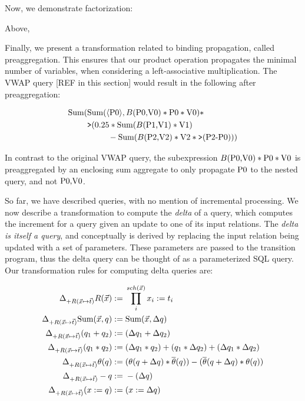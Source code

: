 Now, we demonstrate factorization: 

Above, 

Finally, we present a transformation related to binding propagation, called
preaggregation. This ensures that our product operation propagates the minimal
number of variables, when considering a left-associative multiplication.
The VWAP query [REF in this section] would result in the following after
preaggregation:

\vspace{-3mm}
\begin{align*}
\mbox{Sum}(
& \mbox{Sum}({\langle\mbox{P0}\rangle}, B(\mbox{P0,V0}) * \mbox{P0} * \mbox{V0}) *\\
& \mbox{{\tt >}}(0.25 * \mbox{Sum}(B(\mbox{P1,V1}) * \mbox{V1}) \\
& \qquad \; \; - \mbox{Sum}(B(\mbox{P2,V2}) * \mbox{V2} * \mbox{{\tt >}}(\mbox{P2-P0})))
\end{align*}

\noindent In contrast to the original VWAP query, the subexpression
$B(\mbox{P0,V0}) * \mbox{P0} * \mbox{V0}$ is preaggregated by an enclosing sum aggregate
to only propagate $\mbox{P0}$ to the nested query, and not $\mbox{P0,V0}$.

So far, we have described queries, with no mention of incremental processing. We
now describe a transformation to compute the \textit{delta} of a query, which
computes the increment for a query given an update to one of its input
relations. The \textit{delta is itself a query}, and conceptually
is derived by replacing the input relation being updated with a set of
parameters. These parameters are passed to the transition program, thus the
delta query can be thought of as a parameterized SQL query. Our transformation
rules for computing delta queries are:

\vspace{-3mm}
\begin{align*}
\comment{
\Delta_{+R(\vec{x} \mapsto \vec{t})} c := & \; 0
\\
\Delta_{+R(\vec{x} \mapsto \vec{t})} Var(y) := & \; 0
\\
}
\Delta_{+R(\vec{x} \mapsto \vec{t})} R(\vec{x}) := & \;
\prod_i^{sch(\vec{x})} x_i := t_i
\\
\comment{
\Delta_{+R(\vec{x} \mapsto \vec{t})} S(\vec{y}) := & \; 0
\\
}
\Delta_{+R(\vec{x} \mapsto \vec{t})}
\calcsum(\vec{x},\q) := & \; \calcsum(\vec{x},\Delta\q)
\\
\Delta_{+R(\vec{x} \mapsto \vec{t})} (\qa + \qb) := & \;
(\Delta\qa + \Delta\qb)
\\
\Delta_{+R(\vec{x} \mapsto \vec{t})} (\qa * \qb) := & \;
(\Delta \qa * \qb) +
(\qa * \Delta \qb) +
(\Delta \qa * \Delta \qb)
\\
\Delta_{+R(\vec{x} \mapsto \vec{t})} \theta(\q) := & \;
(\theta(\q + \Delta \q) * \overline{\theta}(\q)) -
(\overline{\theta}(\q+\Delta \q) * \theta(\q))
\\
\Delta_{+R(\vec{x} \mapsto \vec{t})} -\q := & \;
    -(\Delta \q)
\\
\Delta_{+R(\vec{x} \mapsto \vec{t})} (x := \q) := & \;
    (x := \Delta \q)
\end{align*}

